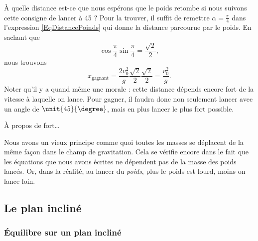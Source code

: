 \documentclass[a4paper,12pt]{book}
\theoremstyle{mes_exemples}	\newtheorem{exemple}[numtho]{Exemple}
\theoremstyle{mes_tho}
\begin{document}
À quelle distance est-ce que nous espérons que le poids retombe si nous suivons cette consigne de lancer à \unit{45}{\degree} ? Pour la trouver, il suffit de remettre $\alpha=\frac{ \pi }{ 4 }$ dans l'expression \eqref{EqDistancePoinds} qui donne la distance parcourue par le poids. En sachant que
\begin{equation}
	\cos\frac{ \pi }{ 4 }\sin\frac{ \pi }{ 4 }=\frac{ \sqrt{2} }{2},
\end{equation}
nous trouvons
\begin{equation}
	x_{\text{gagnant}}=\frac{ 2v_0^2 }{ g }\frac{ \sqrt{2} }{2}\frac{ \sqrt{2} }{2}=\frac{ v_0^2 }{ g }.
\end{equation}
Noter qu'il y a quand même une morale : cette distance dépends encore fort de la vitesse à laquelle on lance. Pour gagner, il faudra donc non seulement lancer avec un  angle de $\unit{45}{\degree}$, mais en plus lancer le plus fort possible.

À propos de \og fort\fg\ldots

\begin{probleme}
	Nous avons un vieux principe comme quoi toutes les masses se déplacent de la même façon dans le champ de gravitation. Cela se vérifie encore dans le fait que les équations que nous avons écrites ne dépendent pas de la masse des poids lancés.  Or, dans la réalité, au lancer du \emph{poids}, plus le poids est lourd, moins on lance loin. 
\end{probleme}

\subsection{Le plan incliné}

\subsubsection{Équilibre sur un plan incliné}
\label{sss_eq_plan}
\end{document}
